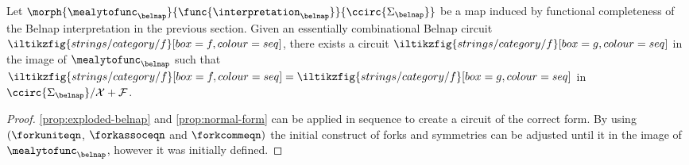 \begin{theorem}
    Let \(
    \morph{\mealytofunc_\belnap}{\func{\interpretation_{\belnap}}}{\ccirc{\Sigma_\belnap}}
    \) be a map induced by functional completeness of the Belnap interpretation
    in the previous section.
    Given an essentially combinational Belnap circuit \(
    \iltikzfig{strings/category/f}[box=f,colour=seq]
    \), there exists a circuit \(
    \iltikzfig{strings/category/f}[box=g,colour=seq]
    \) in the image of \(\mealytofunc_\belnap\) such that \(
    \iltikzfig{strings/category/f}[box=f,colour=seq]
    =
    \iltikzfig{strings/category/f}[box=g,colour=seq]
    \) in \(\ccirc{\Sigma_\belnap} / \mathcal{X} + \mathcal{F}\).
\end{theorem}
\begin{proof}
    \cref{prop:exploded-belnap} and \cref{prop:normal-form} can be applied in
    sequence to create a circuit of the correct form.
    By using \((\forkuniteqn\), \(\forkassoceqn\) and \(\forkcommeqn)\) the
    initial construct of forks and symmetries can be adjusted until it in the
    image of \(\mealytofunc_\belnap\), however it was initially defined.
\end{proof}
